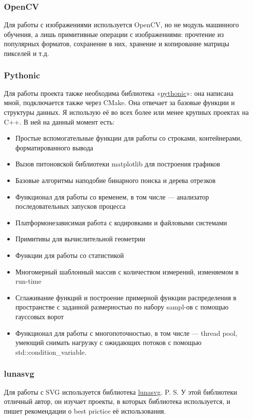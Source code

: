 \documentclass[11pt]{article}
\begin{document}
    \subsubsection{OpenCV}
    Для работы с изображениями используется OpenCV, но не модуль машинного обучения, а лишь примитивные операции с изображениями:
    прочтение из популярных форматов, сохранение в них, хранение и копирование матрицы пикселей и т.д.

    \subsubsection{Pythonic}
    Для работы проекта также необходима библиотека «\href{https://github.com/donRumata03/pythonic}{pythonic}»: она написана мной, подключается также через CMake.
    Она отвечает за базовые функции и структуры данных.
    Я использую её во всех более или менее крупных проектах на C++.
    В ней на данный момент есть:
    \begin{itemize}
        \item Простые вспомогательные функции для работы со строками, контейнерами, форматированного вывода
        \item Вызов питоновской библиотеки matplotlib для построения графиков
        \item Базовые алгоритмы наподобие бинарного поиска и дерева отрезков
        \item Функционал для работы со временем, в том числе — анализатор последовательных запусков процесса
        \item Платформонезависимая работа с кодировками и файловыми системами
        \item Примитивы для вычислительной геометрии
        \item Функции для работы со статистикой
        \item Многомерный шаблонный массив с количеством измерений, изменяемом в run-time
        \item Сглаживание функций и построение примерной функции распределения в пространстве с заданной размерностью по набору sampl-ов с помощью гауссовых ворот
        \item Функционал для работы с многопоточностью, в том числе — thread pool, умеющий снимать нагрузку с ожидающих потоков с помощью std::condition\_variable.
    \end{itemize}

    \subsubsection{lunasvg}
    Для работы с SVG используется библиотека \href{https://github.com/sammycage/lunasvg}{lunasvg}.
    P. S. У этой библиотеки отличный автор, он изучает проекты, в которых библиотека используется, и пишет рекомендации о best prictice её использования.
\end{document}
